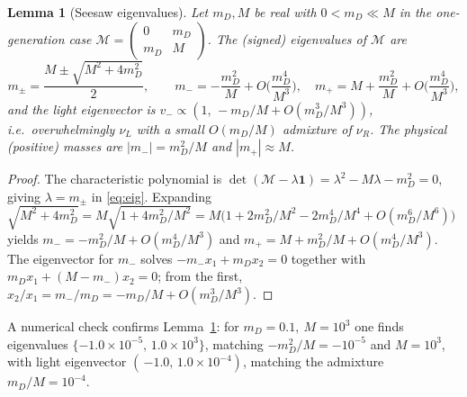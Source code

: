 \documentclass[12pt]{article}
\newtheorem{lemma}{Lemma}
\theoremstyle{definition}
\newcommand{\nuL}{\nu_L}
\newcommand{\nuR}{\nu_R}
\begin{document}
\begin{lemma}[Seesaw eigenvalues]\label{lem:seesaw}
Let $m_D,M$ be real with $0<m_D\ll M$ in the one-generation case
$\mathcal M=\left(\begin{smallmatrix}0&m_D\\ m_D&M\end{smallmatrix}\right)$.
The (signed) eigenvalues of $\mathcal M$ are
\begin{equation}\label{eq:eig}
m_{\pm}=\frac{M\pm\sqrt{M^2+4m_D^2}}{2},\qquad
m_{-}=-\frac{m_D^2}{M}+O\!\Big(\frac{m_D^4}{M^3}\Big),\quad
m_{+}=M+\frac{m_D^2}{M}+O\!\Big(\frac{m_D^4}{M^3}\Big),
\end{equation}
and the light eigenvector is
$v_-\propto(1,\,-m_D/M+O(m_D^3/M^3))$, i.e.\ overwhelmingly $\nuL$ with a
small $O(m_D/M)$ admixture of $\nuR$. The physical (positive) masses are
$|m_-|=m_D^2/M$ and $|m_+|\approx M$.
\end{lemma}
\begin{proof}
The characteristic polynomial is
$\det(\mathcal M-\lambda\mathbf1)=\lambda^2-M\lambda-m_D^2=0$, giving
$\lambda=m_\pm$ in \eqref{eq:eig}. Expanding
$\sqrt{M^2+4m_D^2}=M\sqrt{1+4m_D^2/M^2}
=M\big(1+2m_D^2/M^2-2m_D^4/M^4+O(m_D^6/M^6)\big)$ yields
$m_-=-m_D^2/M+O(m_D^4/M^3)$ and $m_+=M+m_D^2/M+O(m_D^4/M^3)$. The
eigenvector for $m_-$ solves $-m_-x_1+m_Dx_2=0$ together with
$m_Dx_1+(M-m_-)x_2=0$; from the first, $x_2/x_1=m_-/m_D=-m_D/M+O(m_D^3/M^3)$.
\end{proof}

A numerical check confirms Lemma~\ref{lem:seesaw}: for
$m_D=0.1,\ M=10^3$ one finds eigenvalues
$\{-1.0\times10^{-5},\,1.0\times10^{3}\}$, matching
$-m_D^2/M=-10^{-5}$ and $M=10^3$, with light eigenvector
$(\,{-1.0},\,1.0\times10^{-4})$, matching the admixture
$m_D/M=10^{-4}$.
\end{document}
